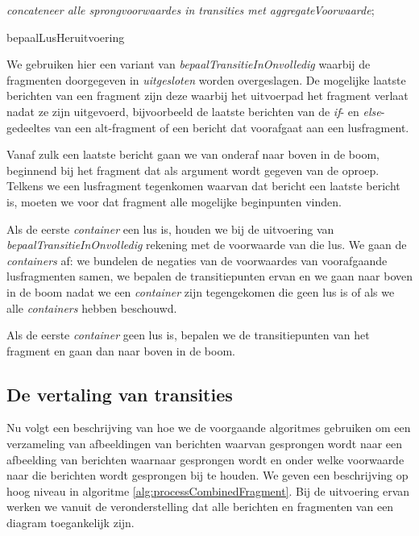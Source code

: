 \begin{algorithm}
{{{{	\textit{concateneer alle sprongvoorwaardes in transities met aggregateVoorwaarde}; \\
	}
	}
	}}
	\caption{bepaalLusHeruitvoering}
	\label{alg:calculateLoopReentry}
\end{algorithm}

We gebruiken hier een variant van \textit{bepaalTransitieInOnvolledig} waarbij de fragmenten doorgegeven in \textit{uitgesloten} worden overgeslagen.
De mogelijke laatste berichten van een fragment zijn deze waarbij het uitvoerpad het fragment verlaat nadat ze zijn uitgevoerd, bijvoorbeeld de laatste berichten van de \textit{if}- en \textit{else}-gedeeltes van een alt-fragment of een bericht dat voorafgaat aan een lusfragment.

Vanaf zulk een laatste bericht gaan we van onderaf naar boven in de boom, beginnend bij het fragment dat als argument wordt gegeven van de oproep. Telkens we een lusfragment tegenkomen waarvan dat bericht een laatste bericht is, moeten we voor dat fragment alle mogelijke beginpunten vinden.

Als de eerste \textit{container} een lus is, houden we bij de uitvoering van \textit{bepaalTransitieInOnvolledig} rekening met de voorwaarde van die lus. We gaan de \textit{containers} af: we bundelen de negaties van de voorwaardes van voorafgaande lusfragmenten samen, we bepalen de transitiepunten ervan en we gaan naar boven in de boom nadat we een \textit{container} zijn tegengekomen die geen lus is of als we alle \textit{containers} hebben beschouwd.

Als de eerste \textit{container} geen lus is, bepalen we de transitiepunten van het fragment en gaan dan naar boven in de boom.

\subsection{De vertaling van transities}\label{sec:process-frag}

Nu volgt een beschrijving van hoe we de voorgaande algoritmes gebruiken om een verzameling van afbeeldingen van berichten waarvan gesprongen wordt naar een afbeelding van berichten waarnaar gesprongen wordt en onder welke voorwaarde naar die berichten wordt gesprongen bij te houden. We geven een beschrijving op hoog niveau in algoritme \ref{alg:processCombinedFragment}. Bij de uitvoering ervan werken we vanuit de veronderstelling dat alle berichten en fragmenten van een diagram toegankelijk zijn.

